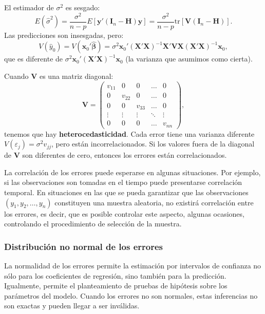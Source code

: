 \documentclass[
]{article}
\begin{document}
El estimador de \(\sigma^{2}\) es sesgado:
\[
E(\widehat{\sigma}^{2}) = \frac{\sigma^{2}}{n-p}E\left[\boldsymbol y'(\boldsymbol I_{n} - \boldsymbol H)\boldsymbol y\right] = \frac{\sigma^{2}}{n-p} \mbox{tr}\left[ \boldsymbol V(\boldsymbol I_{n}-\boldsymbol H)\right].
\]
Las predicciones son insesgadas, pero:
\[
V(\widehat{y}_{0}) = V(\boldsymbol x_{0}'\widehat{\boldsymbol \beta}) = \sigma^{2}\boldsymbol x_{0}'(\boldsymbol X'\boldsymbol X)^{-1}\boldsymbol X'\boldsymbol V\boldsymbol X(\boldsymbol X'\boldsymbol X)^{-1} \boldsymbol x_{0},
\]
que es diferente de \(\sigma^{2}\boldsymbol x_{0}'(\boldsymbol X'\boldsymbol X)^{-1}\boldsymbol x_{0}\) (la varianza que asumimos como cierta).

Cuando \(\boldsymbol V\) es una matriz diagonal:
\[
\boldsymbol V= \begin{pmatrix}
v_{11} & 0 & 0 & \ldots & 0 \\
0 & v_{22} & 0 & \ldots & 0 \\
0 & 0 & v_{33} & \ldots & 0 \\
\vdots & \vdots & \vdots & \ddots & \vdots \\
0 & 0 & 0 & \ldots & v_{nn}
\end{pmatrix},
\]
tenemos que hay \textbf{heterocedasticidad}. Cada error tiene una varianza diferente \(V(\varepsilon_{j})=\sigma^{2}v_{jj}\), pero están incorrelacionados. Si los valores fuera de la diagonal de \(\boldsymbol V\) son diferentes de cero, entonces los errores están correlacionados.

La correlación de los errores puede esperarse en algunas situaciones. Por ejemplo, si las observaciones son tomadas en el tiempo puede presentarse correlación temporal. En situaciones en las que se pueda garantizar que las observaciones \((y_{1},y_{2},\ldots,y_{n})\) constituyen una muestra aleatoria, no existirá correlación entre los errores, es decir, que es posible controlar este aspecto, algunas ocasiones, controlando el procedimiento de selección de la muestra.

\hypertarget{distribuciuxf3n-no-normal-de-los-errores}{%
\subsubsection{Distribución no normal de los errores}\label{distribuciuxf3n-no-normal-de-los-errores}}

La normalidad de los errores permite la estimación por intervalos de confianza no sólo para los coeficientes de regresión, sino también para la predicción. Igualmente, permite el planteamiento de pruebas de hipótesis sobre los parámetros del modelo. Cuando los errores no son normales, estas inferencias no son exactas y pueden llegar a ser inválidas.
\end{document}
